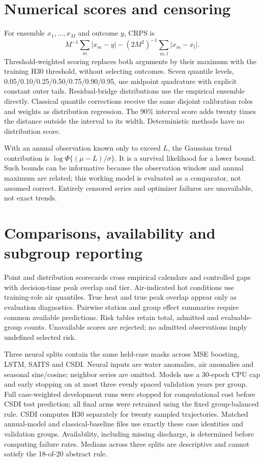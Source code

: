 \documentclass[draft]{agujournal2025}
\begin{document}
\section{Numerical scores and censoring}
For ensemble $x_1,\ldots,x_M$ and outcome $y$, CRPS is
\[ M^{-1}\sum_m|x_m-y|-(2M^2)^{-1}\sum_{m,l}|x_m-x_l|. \]
Threshold-weighted scoring replaces both arguments by their maximum with the training H30 threshold, without selecting outcomes. Seven quantile levels, 0.05/0.10/0.25/0.50/0.75/0.90/0.95, use midpoint quadrature with explicit constant outer tails. Residual-bridge distributions use the empirical ensemble directly. Classical quantile corrections receive the same disjoint calibration roles and weights as distribution regression. The 90\% interval score adds twenty times the distance outside the interval to its width. Deterministic methods have no distribution score.

With an annual observation known only to exceed $L$, the Gaussian trend contribution is $\log\Phi\{(\mu-L)/\sigma\}$. It is a survival likelihood for a lower bound. Such bounds can be informative because the observation window and annual maximum are related; this working model is evaluated as a comparator, not assumed correct. Entirely censored series and optimizer failures are unavailable, not exact trends.

\section{Comparisons, availability and subgroup reporting}
Point and distribution scorecards cross empirical calendars and controlled gaps with decision-time peak overlap and tier. Air-indicated hot conditions use training-role air quantiles. True heat and true peak overlap appear only as evaluation diagnostics. Pairwise station and group effect summaries require common available predictions. Risk tables retain total, admitted and evaluable-group counts. Unavailable scores are rejected; no admitted observations imply undefined selected risk.

Three neural splits contain the same held-case masks across MSE boosting, LSTM, SAITS and CSDI. Neural inputs are water anomalies, air anomalies and seasonal sine/cosine; neighbor series are omitted. Models use a 30-epoch CPU cap and early stopping on at most three evenly spaced validation years per group. Full case-weighted development runs were stopped for computational cost before CSDI test prediction; all final arms were retrained using the fixed group-balanced rule. CSDI computes H30 separately for twenty sampled trajectories. Matched annual-model and classical-baseline files use exactly these case identities and validation groups. Availability, including missing discharge, is determined before computing failure rates. Medians across three splits are descriptive and cannot satisfy the 18-of-20 abstract rule.
\end{document}
